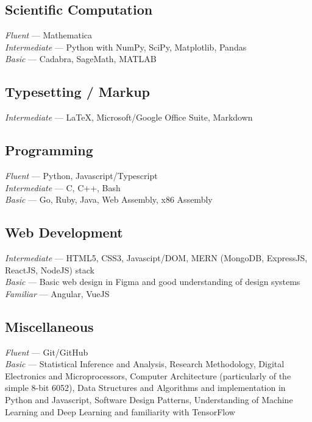 \documentclass[11pt, a4paper]{article}
\begin{document}
\subsection{\large Scientific Computation}
\hspace{0.01\linewidth}
\parbox{0.88\linewidth}{
    {\textit{Fluent} --- \small Mathematica} \\
    {\textit{Intermediate} --- \small Python with NumPy, SciPy, Matplotlib, Pandas} \\
    {\textit{Basic} --- \small Cadabra, SageMath, MATLAB}
}
\vspace{-0.3cm}
\subsection{\large Typesetting / Markup}
\hspace{0.01\linewidth}
\parbox{0.88\linewidth}{
    {\textit{Intermediate} --- \small \LaTeX, Microsoft/Google Office Suite, Markdown}
}
\vspace{-0.3cm}
\subsection{\large Programming}
\hspace{0.01\linewidth}
\parbox{0.88\linewidth}{
    {\textit{Fluent} --- \small Python, Javascript/Typescript} \\
    {\textit{Intermediate} --- \small C, C++, Bash} \\
    {\textit{Basic} --- \small Go, Ruby, Java, Web Assembly, x86 Assembly}
}
\vspace{-0.3cm}
\subsection{\large Web Development}
\hspace{0.01\linewidth}
\parbox{0.88\linewidth}{
    {\textit{Intermediate} --- \small HTML5, CSS3, Javascipt/DOM, MERN (MongoDB, ExpressJS, ReactJS, NodeJS) stack} \\
    {\textit{Basic} --- \small Basic web design in Figma and good understanding of design systems} \\
    {\textit{Familiar} --- \small Angular, VueJS}
}
\vspace{-0.3cm}
\subsection{\large Miscellaneous}
\hspace{0.01\linewidth}
\parbox{0.88\linewidth}{
    {\textit{Fluent} --- \small Git/GitHub} \\
    {\textit{Basic} --- \small Statistical Inference and Analysis, Research Methodology, Digital Electronics and Microprocessors, Computer Architecture (particularly of the simple 8-bit 6052), Data Structures and Algorithms and implementation in Python and Javascript, Software Design Patterns, Understanding of Machine Learning and Deep Learning and familiarity with TensorFlow}
}
\vspace{-0.3cm}
\end{document}
